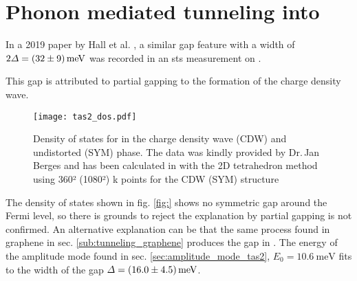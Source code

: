 \documentclass[main.tex]{subfiles}
\begin{document}
\section{Phonon mediated tunneling into \TaS}

In a 2019 paper by Hall et al. \cite{hall_environmental_2019}, a similar gap feature with a width of \(2 \Delta = \SI[separate-uncertainty = true]{32 \pm 9}{\milli\eV}\) was recorded in an \acrshort{sts} measurement on \TaS.

This gap is attributed to partial gapping to the formation of the charge density wave.

\begin{figure}[htb!]
    \centering
    \texttt{[image: tas2\_dos.pdf]}
    \caption{Density of states for \TaS in the charge density wave (CDW) and undistorted (SYM) phase. The data was kindly provided by Dr.\,Jan Berges and has been calculated in \QE with the 2D tetrahedron method using 360² (1080²) k points for the CDW (SYM) structure}
    \label{fig:tas2_dos}
\end{figure}
The density of states shown in fig. \ref{fig:} shows no symmetric gap around the Fermi level, so there is grounds to reject the explanation by partial gapping is not confirmed.
An alternative explanation can be that the same process found in graphene in sec. \ref{sub:tunneling_graphene} produces the gap in \TaS.
The energy of the amplitude mode found in sec. \ref{sec:amplitude_mode_tas2}, \(E_0 = \SI{10.6}{\milli\eV}\) fits to the width of the gap \(\Delta = \SI[separate-uncertainty = true]{16 \pm 4.5}{\milli\eV}\).
\end{document}
